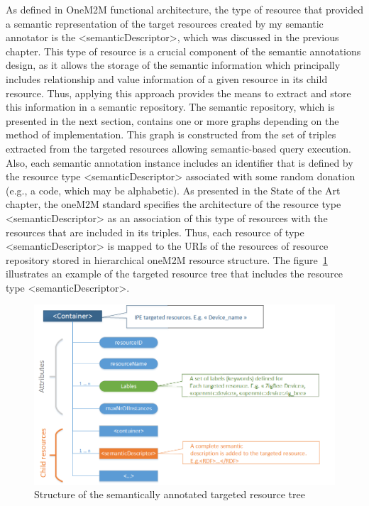 As defined in OneM2M functional architecture, the type of resource that provided a semantic representation of the target resources created by my semantic annotator is the <semanticDescriptor>, which was discussed in the previous chapter. This type of resource is a crucial component of the semantic annotations design, as it allows the storage of the semantic information which principally includes relationship and value information of a given resource in its child resource. Thus, applying this approach provides the means to extract and store this information in a semantic repository. The semantic repository, which is presented in the next section, contains one or more graphs depending on the method of implementation. This graph is constructed from the set of triples extracted from the targeted resources allowing semantic-based query execution. Also, each semantic annotation instance includes an identifier that is defined by the resource type <semanticDescriptor> associated with some random donation (e.g., a code, which may be alphabetic). As presented in the State of the Art chapter, the oneM2M standard specifies the architecture of the resource type <semanticDescriptor> as an association of this type of resources with the resources that are included in its triples. Thus, each resource of type <semanticDescriptor> is mapped to the URIs of the resources of resource repository stored in hierarchical oneM2M resource structure. The figure~\ref{fig:contrib2:example} illustrates an example of the targeted resource tree that includes the resource type <semanticDescriptor>.\par
\begin{figure}[htbp]
    \centering
    \includegraphics[width=1.1\textwidth]{resources/images/sdlabel}
    \caption{Structure of the semantically annotated targeted resource tree }\label{fig:contrib2:example}
\end{figure}
